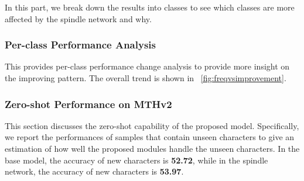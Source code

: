 In this part, we break down the results into classes to see which classes are more affected by the spindle network and why. 
\subsubsection{Per-class Performance Analysis}


This provides per-class performance change analysis to provide more insight on the improving pattern. 
The overall trend is shown in ~\ref{fig:freqvsimprovement}. 



\subsubsection{Zero-shot Performance on MTHv2}
This section discusses the zero-shot capability of the proposed model. Specifically, we report the performances of samples that contain unseen characters to give an estimation of how well the proposed modules handle the unseen characters. In the base model, the accuracy of new characters is \textbf{52.72}, while in the spindle network, the accuracy of new characters is \textbf{53.97}.


